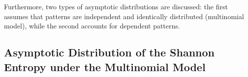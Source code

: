 Furthermore, two types of asymptotic distributions are discussed: the first assumes that patterns are independent and identically distributed (multinomial model), while the second accounts for dependent patterns.

\subsection {Asymptotic Distribution of the Shannon Entropy under the Multinomial Model}\label{Subsec:Multinomial} 



